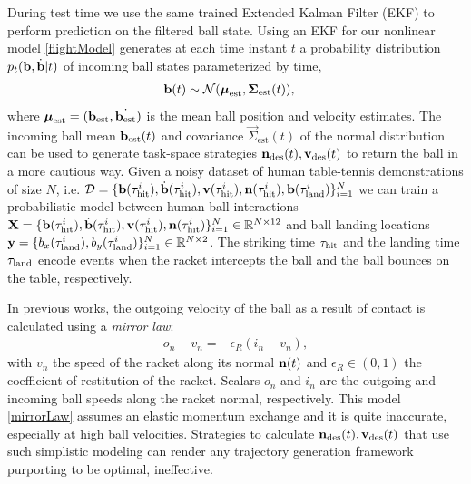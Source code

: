 During test time we use the same trained Extended Kalman Filter (EKF) to perform prediction on the filtered ball state. 
Using an EKF for our nonlinear model \eqref{flightModel} generates at each time instant $t$ a probability distribution $p_t(\boldsymbol{\mathrm{b}},\dot{\boldsymbol{\mathrm{b}}}|t)$ of incoming ball states parameterized by time, 
%
\begin{align}
\boldsymbol{\mathrm{b}}(t) &\sim \mathcal{N}(\boldsymbol{\mathrm{\mu}}_{\textrm{est}},\boldsymbol{\mathrm{\Sigma}}_{\textrm{est}}(t)),
\label{ballProcess}
\end{align}
%
\noindent where $\boldsymbol{\mathrm{\mu}}_{\textrm{est}} = (\boldsymbol{\mathrm{b}}_{\mathrm{est}},\dot{\boldsymbol{\mathrm{b}}_{\mathrm{est}}})$ is the mean ball position and velocity estimates.
%
The incoming ball mean $\boldsymbol{\mathrm{b}}_{\mathrm{est}}(t)$ and covariance $\vec{\Sigma}_{\textrm{est}}(t)$ of the normal distribution can be used to generate task-space strategies $\boldsymbol{\mathrm{n}}_{\textrm{des}}(t), \boldsymbol{\mathrm{v}}_{\textrm{des}}(t)$ to return the ball in a more cautious way. Given a noisy dataset of human table-tennis demonstrations of size $N$, i.e. $\mathcal{D} = \{\boldsymbol{\mathrm{b}}(\tau_{\textrm{hit}}^i), \dot{\boldsymbol{\mathrm{b}}}(\tau_{\textrm{hit}}^i), \boldsymbol{\mathrm{v}}(\tau_{\textrm{hit}}^i), \boldsymbol{\mathrm{n}}(\tau_{\textrm{hit}}^i), \boldsymbol{\mathrm{b}}(\tau_{\textrm{land}}^i)\}_{i=1}^{N}$ we can train a probabilistic model between human-ball interactions $\boldsymbol{\mathrm{X}} = \{\boldsymbol{\mathrm{b}}(\tau_{\textrm{hit}}^i), \dot{\boldsymbol{\mathrm{b}}}(\tau_{\textrm{hit}}^i), \boldsymbol{\mathrm{v}}(\tau_{\textrm{hit}}^i), \boldsymbol{\mathrm{n}}(\tau_{\textrm{hit}}^i)\}_{i=1}^{N} \in \mathbb{R}^{N \times 12}$ and ball landing locations $\boldsymbol{\mathrm{y}} = \{b_x(\tau_{\textrm{land}}^i), b_y(\tau_{\textrm{land}}^i)\}_{i=1}^{N} \in \mathbb{R}^{N \times 2}$. The striking time $\tau_{\textrm{hit}}$ and the landing time $\tau_{\textrm{land}}$ encode events when the racket intercepts the ball and the ball bounces on the table, respectively.  	

In previous works, the outgoing velocity of the ball as a result of contact is calculated using a \emph{mirror law}: 
%
\begin{align}
o_{n} - v_{n} = -\epsilon_{R} (i_{n} - v_{n}),
\label{mirrorLaw}
\end{align}
%
\noindent with $v_{n}$ the speed of the racket along its normal $\boldsymbol{\mathrm{n}}(t)$ and $\epsilon_{R} \in (0,1)$ the coefficient of restitution of the racket. Scalars $o_{n}$ and $i_{n}$ are the outgoing and incoming ball speeds along the racket normal, respectively. This model \eqref{mirrorLaw} assumes an elastic momentum exchange and it is quite inaccurate, especially at high ball velocities. Strategies to calculate $\boldsymbol{\mathrm{n}}_{\textrm{des}}(t), \boldsymbol{\mathrm{v}}_{\textrm{des}}(t)$ that use such simplistic modeling can render any trajectory generation framework purporting to be optimal, ineffective.


